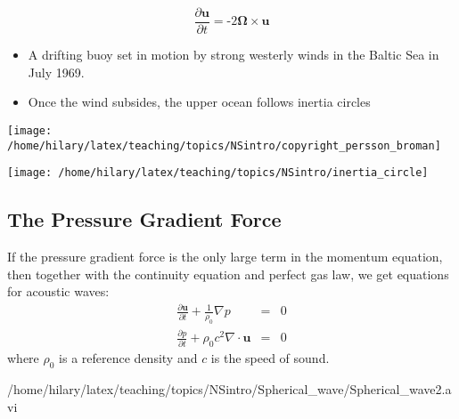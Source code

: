 \begin{minipage}[c]{0.35\columnwidth}%
\[
\frac{\partial\mathbf{u}}{\partial t}=\text{-}2\bm{\Omega}\times\mathbf{u}
\]

\begin{itemize}
\item \begin{flushleft}
A drifting buoy set in motion by strong westerly winds in the Baltic
Sea in July 1969. 
\par\end{flushleft}
\item \begin{flushleft}
Once the wind subsides, the upper ocean follows inertia circles
\par\end{flushleft}
\end{itemize}
\texttt{[image: /home/hilary/latex/teaching/topics/NSintro/copyright\_persson\_broman]}%
\end{minipage}\hfill{}%
\begin{minipage}[c]{0.6\columnwidth}%
\texttt{[image: /home/hilary/latex/teaching/topics/NSintro/inertia\_circle]}%
\end{minipage}

\subsection{The Pressure Gradient Force}

\begin{minipage}[c]{0.48\columnwidth}%
If the pressure gradient force is the only large term in the momentum
equation, then together with the continuity equation and perfect gas
law, we get equations for acoustic waves:
\begin{eqnarray*}
\frac{\partial\mathbf{u}}{\partial t}+\frac{1}{\rho_{0}}\nabla p & = & 0\\
\frac{\partial p}{\partial t}+\rho_{0}c^{2}\nabla\cdot\mathbf{u} & = & 0
\end{eqnarray*}
where $\rho_{0}$ is a reference density and $c$ is the speed of
sound.%
\end{minipage}\hfill{}%
\begin{minipage}[c]{0.48\columnwidth}%
{/home/hilary/latex/teaching/topics/NSintro/Spherical_wave/Spherical_wave2.avi}%
\end{minipage}

